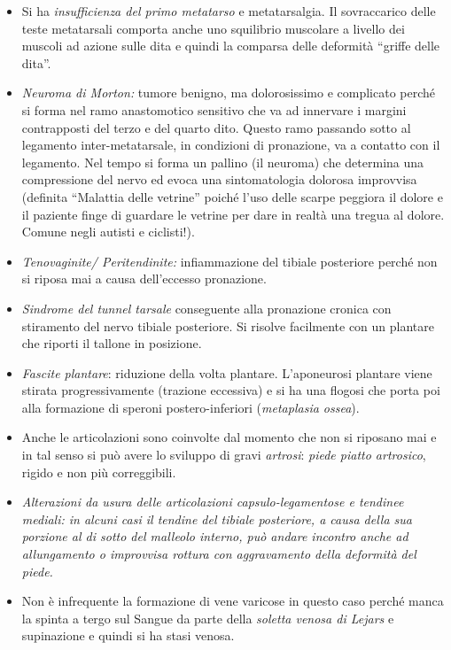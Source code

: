 \documentclass[]{article}
\begin{document}
\begin{itemize}
\item
  Si ha \emph{insufficienza del primo metatarso} e metatarsalgia. Il
  sovraccarico delle teste metatarsali comporta anche uno squilibrio
  muscolare a livello dei muscoli ad azione sulle dita e quindi la
  comparsa delle deformità ``griffe delle dita''.
\item
  \emph{Neuroma di Morton:} tumore benigno, ma dolorosissimo e
  complicato perché si forma nel ramo anastomotico sensitivo che va ad
  innervare i margini contrapposti del terzo e del quarto dito. Questo
  ramo passando sotto al legamento inter-metatarsale, in condizioni di
  pronazione, va a contatto con il legamento. Nel tempo si forma un
  pallino (il neuroma) che determina una compressione del nervo ed evoca
  una sintomatologia dolorosa improvvisa (definita ``Malattia delle
  vetrine'' poiché l'uso delle scarpe peggiora il dolore e il paziente
  finge di guardare le vetrine per dare in realtà una tregua al dolore.
  Comune negli autisti e ciclisti!).
\item
  \emph{Tenovaginite/ Peritendinite:} infiammazione del tibiale
  posteriore perché non si riposa mai a causa dell'eccesso pronazione.
\item
  \emph{Sindrome del tunnel tarsale} conseguente alla pronazione cronica
  con stiramento del nervo tibiale posteriore. Si risolve facilmente con
  un plantare che riporti il tallone in posizione.
\item
  \emph{Fascite plantare}: riduzione della volta plantare. L'aponeurosi
  plantare viene stirata progressivamente (trazione eccessiva) e si ha
  una flogosi che porta poi alla formazione di speroni postero-inferiori
  (\emph{metaplasia ossea}).
\item
  Anche le articolazioni sono coinvolte dal momento che non si riposano
  mai e in tal senso si può avere lo sviluppo di gravi \emph{artrosi}:
  \emph{\emph{piede piatto artrosico}}, rigido e non più correggibili.
\item
  \emph{Alterazioni da usura delle \emph{articolazioni
  capsulo-legamentose e tendinee mediali}: in alcuni casi il tendine del
  tibiale posteriore, a causa della sua porzione al di sotto del
  malleolo interno, può andare incontro anche ad allungamento o
  improvvisa rottura con aggravamento della deformità del piede. }
\item
  Non è infrequente la formazione di vene varicose in questo caso perché
  manca la spinta a tergo sul Sangue da parte della \emph{soletta venosa
  di Lejars} e supinazione e quindi si ha stasi venosa.
\end{itemize}
\end{document}

